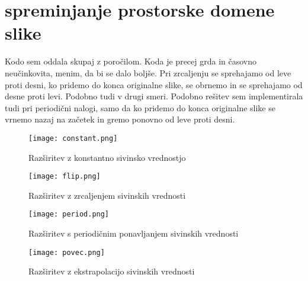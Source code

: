 \documentclass[12pt,a4paper]{article}
\begin{document}
\section{spreminjanje prostorske domene slike }
Kodo sem oddala skupaj z poročilom. Koda je precej grda in časovno neučinkovita, menim, da bi se dalo boljše. Pri zrcaljenju se sprehajamo od leve proti desni, ko pridemo do konca originalne slike, se obrnemo in se sprehajamo od desne proti levi. Podobno tudi v drugi smeri. Podobno rešitev sem implementirala tudi pri periodični nalogi, samo da ko pridemo do konca originalne slike se vrnemo nazaj na začetek in gremo ponovno od leve proti desni. 
\pagebreak
\begin{figure}[h!]
  \begin{center}
    \texttt{[image: constant.png]}
    \caption{Razširitev z konstantno sivinsko vrednostjo}
    \label{fig:}
  \end{center}
\end{figure}
\begin{figure}[h!]
  \begin{center}
    \texttt{[image: flip.png]}
    \caption{Razširitev z zrcaljenjem sivinskih vrednosti}
    \label{fig:}
  \end{center}
\end{figure}
\pagebreak
\begin{figure}[h!]
  \begin{center}
    \texttt{[image: period.png]}
    \caption{Razširitev s periodičnim ponavljanjem sivinskih vrednosti}
    \label{fig:}
  \end{center}
\end{figure}
\begin{figure}[h!]
  \begin{center}
    \texttt{[image: povec.png]}
    \caption{Razširitev z ekstrapolacijo sivinskih vrednosti}
    \label{fig:}
  \end{center}
\end{figure}
\end{document}

